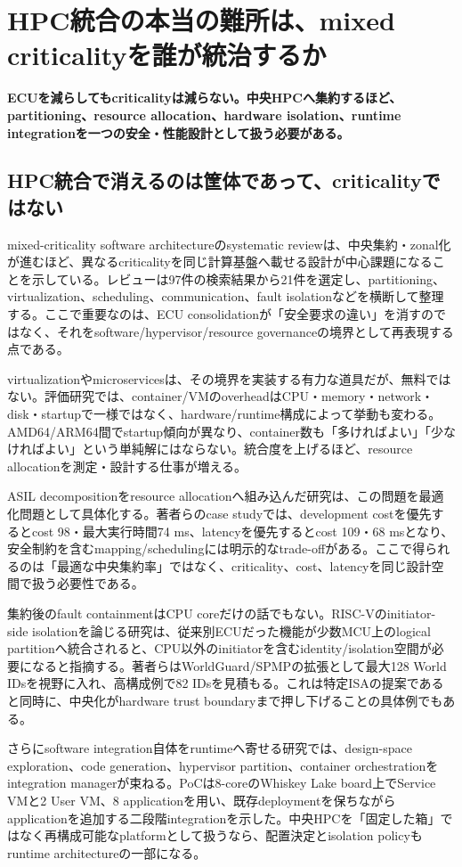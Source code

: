 \section{HPC統合の本当の難所は、mixed criticalityを誰が統治するか}
\noindent\textbf{ECUを減らしてもcriticalityは減らない。中央HPCへ集約するほど、partitioning、resource allocation、hardware isolation、runtime integrationを一つの安全・性能設計として扱う必要がある。}\autocite{src-6ad0c67eaab9,src-9f1d8b2b8944,src-f657aea94b5e}

\begin{surveyarticlebody}
\subsection{HPC統合で消えるのは筐体であって、criticalityではない}

mixed-criticality software architectureのsystematic reviewは、中央集約・zonal化が進むほど、異なるcriticalityを同じ計算基盤へ載せる設計が中心課題になることを示している。レビューは97件の検索結果から21件を選定し、partitioning、virtualization、scheduling、communication、fault isolationなどを横断して整理する。ここで重要なのは、ECU consolidationが「安全要求の違い」を消すのではなく、それをsoftware/hypervisor/resource governanceの境界として再表現する点である。\autocite{src-9f1d8b2b8944}

virtualizationやmicroservicesは、その境界を実装する有力な道具だが、無料ではない。評価研究では、container/VMのoverheadはCPU・memory・network・disk・startupで一様ではなく、hardware/runtime構成によって挙動も変わる。AMD64/ARM64間でstartup傾向が異なり、container数も「多ければよい」「少なければよい」という単純解にはならない。統合度を上げるほど、resource allocationを測定・設計する仕事が増える。\autocite{src-6ad0c67eaab9}

ASIL decompositionをresource allocationへ組み込んだ研究は、この問題を最適化問題として具体化する。著者らのcase studyでは、development costを優先するとcost 98・最大実行時間74 ms、latencyを優先するとcost 109・68 msとなり、安全制約を含むmapping/schedulingには明示的なtrade-offがある。ここで得られるのは「最適な中央集約率」ではなく、criticality、cost、latencyを同じ設計空間で扱う必要性である。\autocite{src-f657aea94b5e}

集約後のfault containmentはCPU coreだけの話でもない。RISC-Vのinitiator-side isolationを論じる研究は、従来別ECUだった機能が少数MCU上のlogical partitionへ統合されると、CPU以外のinitiatorを含むidentity/isolation空間が必要になると指摘する。著者らはWorldGuard/SPMPの拡張として最大128 World IDsを視野に入れ、高構成例で82 IDsを見積もる。これは特定ISAの提案であると同時に、中央化がhardware trust boundaryまで押し下げることの具体例でもある。\autocite{src-fe402f610af7}

さらにsoftware integration自体をruntimeへ寄せる研究では、design-space exploration、code generation、hypervisor partition、container orchestrationをintegration managerが束ねる。PoCは8-coreのWhiskey Lake board上でService VMと2 User VM、8 applicationを用い、既存deploymentを保ちながらapplicationを追加する二段階integrationを示した。中央HPCを「固定した箱」ではなく再構成可能なplatformとして扱うなら、配置決定とisolation policyもruntime architectureの一部になる。\autocite{src-8deb33ac8e08}
\end{surveyarticlebody}


